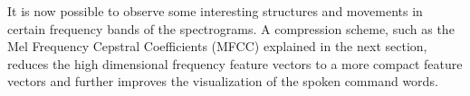 \FloatBarrier
\noindent
It is now possible to observe some interesting structures and movements in certain frequency bands of the spectrograms.
A compression scheme, such as the Mel Frequency Cepstral Coefficients (MFCC) explained in the next section, reduces the high dimensional frequency feature vectors to a more compact feature vectors and further improves the visualization of the spoken command words.